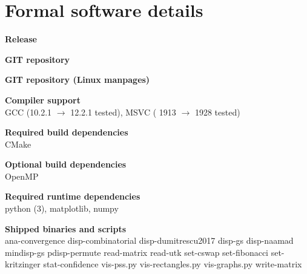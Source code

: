 \section*{Formal software details}
  \textbf{Release}\\
  \dptkversion
  
  \textbf{GIT repository}\\
  
  \textbf{GIT repository (Linux manpages)}\\
  
  \textbf{Compiler support}\\
  GCC (10.2.1 $\rightarrow$ 12.2.1 tested), MSVC ( 1913 $\rightarrow$ 1928 tested)

  \textbf{Required build dependencies}\\
  CMake
    
  \textbf{Optional build dependencies}\\
  OpenMP
  
  \textbf{Required runtime dependencies}\\
  python (3), matplotlib, numpy
  
  \textbf{Shipped binaries and scripts}\\
  ana-convergence
  disp-combinatorial
disp-dumitrescu2017
disp-gs
disp-naamad
mindisp-gs
pdisp-permute
read-matrix
read-utk
set-cswap
set-fibonacci
set-kritzinger
stat-confidence
vis-pss.py
vis-rectangles.py
vis-graphs.py
write-matrix
\clearpage
